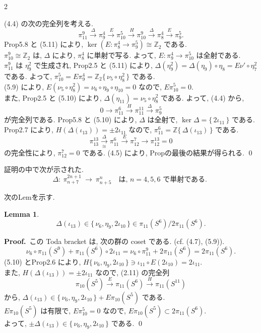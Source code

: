 \documentclass[10pt, leqno]{ltjsarticle}
\newcommand{\toda}[1]{\{\,#1\,\}}              %
\newcommand{\gen}[1]{\{\,#1\,\}}       %
\numberwithin{equation}{section}
\theoremstyle{plain}
\newtheorem{lemma}[theorem]{Lemma}
\theoremstyle{definition}
\theoremstyle{remark}
\begin{document}
\begin{paracol}{2}

(4.4) の次の完全列を考える. 
\[
\pi^{9}_{11}\xrightarrow{\ \Delta\ }\pi^{4}_{9}\xrightarrow{\ E }\pi^{5}_{10}
\xrightarrow{\ H }\pi^{9}_{10}\xrightarrow{\ \Delta\ }\pi^{4}_{8}\xrightarrow{E}\pi_9^5 .
\]
Prop5.8 と (5.11) により, \(\ker(E:\pi_8^4\to\pi_9^5)\cong\mathbb Z_2\) である. \\
\(\pi_{10}^9\cong\mathbb Z_2\) は, \(\Delta\) により, \(\pi_8^4\) に単射で写る. 
よって, \(E:\pi_9^4\to\pi_{10}^5\) は全射である. \\
\(\pi_{11}^9\) は \(\eta_9^2\) で生成され, Prop2.5 と (5.11) により, 
\(\Delta(\eta_9^2)=\Delta(\eta_9)\circ\eta_8=E\nu'\circ\eta_7^2\) である. 
よって, \(\pi_{10}^5=E\pi_9^4=\mathbb Z_2\gen{\nu_5\circ\eta_8^2}\) である. \\
(5.9) により, \(E(\nu_5\circ\eta_8^2)=\nu_6\circ\eta_9\circ\eta_{10}=0\) なので, 
\(E\pi_{10}^5=0 .\)\\
また, Prop2.5 と (5.10) により, \(\Delta(\eta_{11})=\nu_5\circ\eta_8^2\) である. 
よって, (4.4) から, 
\[
0\to \pi^{6}_{11}\xrightarrow{H}\pi^{11}_{11}\xrightarrow{\ \Delta\ }\pi^{5}_{9}
\]
が完全列である. 
Prop5.8 と (5.10) により, \(\Delta\) は全射で, \(\ker\Delta=\gen{2\iota_{11}}\) である. \\
Prop2.7 により, \(H(\Delta(\iota_{13}))=\pm2\iota_{11}\) なので, 
\(\pi_{11}^6=\mathbb Z \gen{\Delta(\iota_{13})}\) である. 
\[
\pi^{13}_{13}\xrightarrow[\cong]{\Delta}\pi^{6}_{11}\xrightarrow{E}\pi^{7}_{12}\xrightarrow{}\pi_{12}^{13}=0
\]
の完全性により, \(\pi_{12}^7=0\) である. 
(4.5) により, Propの最後の結果が得られる. 
\qed

証明の中で次が示された. 
\begin{equation}\label{eq:5.12}
\Delta:\ \pi^{2n+1}_{n+7}\ \longrightarrow\ \pi^{n}_{n+5}
\quad\text{は, }n=4,5,6\text{ で単射である. }
\end{equation}

次のLemを示す. 
\begin{lemma}\label{lemma:5.10}
\[
\Delta(\iota_{13})\in\toda{\nu_6,\eta_9,2\iota_{10}}\in\pi_{11}(S^6)/2\pi_{11}(S^6) .
\]
\end{lemma}

\noindent
\textbf{Proof.}\ 
この Toda bracket は, 次の群の coset である. (cf. (4.7), (5.9)).
\[
\nu_6\circ \pi_{11}(S^9)+\pi_{11}(S^6)\circ2\iota_{11}
= \nu_6\circ\pi_{11}^9+2\pi_{11}(S^6)=2\pi_{11}(S^6) .
\]
(5.10) とProp2.6 により, 
\(H\toda{\nu_6,\eta_9,2\iota_{10}}\ni\iota_{11}\circ E(2\iota_{10})=2\iota_{11} .\)\\
また, \(H(\Delta(\iota_{13}))=\pm2\iota_{11}\) なので, (2.11) の完全列
\[
\pi_{10}(S^5)\xrightarrow{E}\pi_{11}(S^6)\xrightarrow{H}\pi_{11}(S^{11})
\]
から, 
\(\Delta(\iota_{13})\in\toda{\nu_6,\eta_9,2\iota_{10}} + E\pi_{10}(S^5)\) である. \\
\(E\pi_{10}(S^5)\) は有限で, \(E\pi_{10}^5=0\) なので, 
\(E\pi_{10}(S^5)\subset2\pi_{11}(S^6) .\)\\
よって, \(\pm\Delta(\iota_{13})\in\toda{\nu_6,\eta_9,2\iota_{10}}\) である. 
\qed


\end{paracol}
\end{document}
